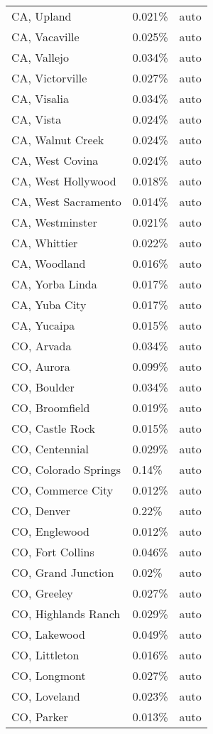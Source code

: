 \begin{longtable}[]{@{}lll@{}}
CA, Upland & 0.021\% & auto \\
CA, Vacaville & 0.025\% & auto \\
CA, Vallejo & 0.034\% & auto \\
CA, Victorville & 0.027\% & auto \\
CA, Visalia & 0.034\% & auto \\
CA, Vista & 0.024\% & auto \\
CA, Walnut Creek & 0.024\% & auto \\
CA, West Covina & 0.024\% & auto \\
CA, West Hollywood & 0.018\% & auto \\
CA, West Sacramento & 0.014\% & auto \\
CA, Westminster & 0.021\% & auto \\
CA, Whittier & 0.022\% & auto \\
CA, Woodland & 0.016\% & auto \\
CA, Yorba Linda & 0.017\% & auto \\
CA, Yuba City & 0.017\% & auto \\
CA, Yucaipa & 0.015\% & auto \\
CO, Arvada & 0.034\% & auto \\
CO, Aurora & 0.099\% & auto \\
CO, Boulder & 0.034\% & auto \\
CO, Broomfield & 0.019\% & auto \\
CO, Castle Rock & 0.015\% & auto \\
CO, Centennial & 0.029\% & auto \\
CO, Colorado Springs & 0.14\% & auto \\
CO, Commerce City & 0.012\% & auto \\
CO, Denver & 0.22\% & auto \\
CO, Englewood & 0.012\% & auto \\
CO, Fort Collins & 0.046\% & auto \\
CO, Grand Junction & 0.02\% & auto \\
CO, Greeley & 0.027\% & auto \\
CO, Highlands Ranch & 0.029\% & auto \\
CO, Lakewood & 0.049\% & auto \\
CO, Littleton & 0.016\% & auto \\
CO, Longmont & 0.027\% & auto \\
CO, Loveland & 0.023\% & auto \\
CO, Parker & 0.013\% & auto \\

\end{longtable}

